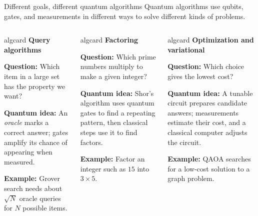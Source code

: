 \begin{frame}{Different goals, different quantum algorithms}
  \small
  Quantum algorithms use qubits, gates, and measurements in different ways to
  solve different kinds of problems.

  \vspace{0.55em}
  \begin{columns}[T,onlytextwidth]
    \begin{beamercolorbox}[wd=\linewidth,sep=0.7em,rounded=true]{algcard}
      \centering\textbf{Query algorithms}\par
      \vspace{0.4em}
      \raggedright\textbf{Question:} Which item in a large set has the property we want?\par
      \vspace{0.35em}
      \textbf{Quantum idea:} An \emph{oracle} marks a correct answer; gates amplify its chance of appearing when measured.\par
      \vspace{0.35em}
      \textbf{Example:} Grover search needs about $\sqrt{N}$ oracle queries for $N$ possible items.
    \end{beamercolorbox}

    \begin{beamercolorbox}[wd=\linewidth,sep=0.7em,rounded=true]{algcard}
      \centering\textbf{Factoring}\par
      \vspace{0.4em}
      \raggedright\textbf{Question:} Which prime numbers multiply to make a given integer?\par
      \vspace{0.35em}
      \textbf{Quantum idea:} Shor's algorithm uses quantum gates to find a repeating pattern, then classical steps use it to find factors.\par
      \vspace{0.35em}
      \textbf{Example:} Factor an integer such as $15$ into $3\times5$.
    \end{beamercolorbox}

    \begin{beamercolorbox}[wd=\linewidth,sep=0.7em,rounded=true]{algcard}
      \centering\textbf{Optimization and variational}\par
      \vspace{0.4em}
      \raggedright\textbf{Question:} Which choice gives the lowest cost?\par
      \vspace{0.35em}
      \textbf{Quantum idea:} A tunable circuit prepares candidate answers; measurements estimate their cost, and a classical computer adjusts the circuit.\par
      \vspace{0.35em}
      \textbf{Example:} QAOA searches for a low-cost solution to a graph problem.
    \end{beamercolorbox}
  \end{columns}


\end{frame}
